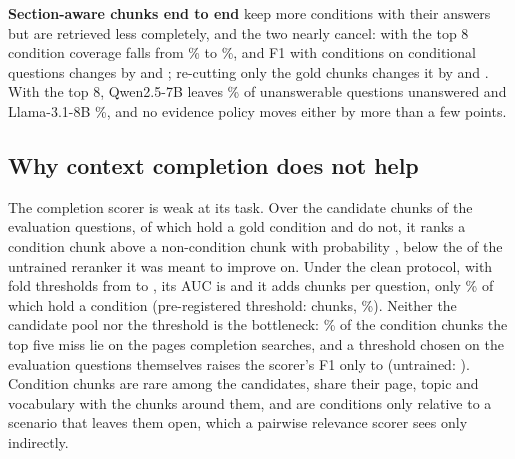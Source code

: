 \textbf{Section-aware chunks end to end} keep more conditions with their answers but are retrieved less completely, and the two nearly cancel: with the top 8 condition coverage falls from \revSecTopCondQwenCtxBase\% to \revSecTopCondQwenCtx\%, and F1 with conditions on conditional questions changes by \revSecTopCondQwenPt{} and \revSecTopCondLlamaPt; re-cutting only the gold chunks changes it by \revSecGoldCondQwenPt{} and \revSecGoldCondLlamaPt. With the top 8, Qwen2.5-7B leaves \unansTopQwen\% of unanswerable questions unanswered and Llama-3.1-8B \unansTopLlama\%, and no evidence policy moves either by more than a few points.

\subsection{Why context completion does not help}
\label{sec:completion}

The completion scorer is weak at its task. Over the candidate chunks of the evaluation questions, \qPosPairs{} of which hold a gold condition and \qNegPairs{} do not, it ranks a condition chunk above a non-condition chunk with probability \qAucTrained, below the \qAucZero{} of the untrained reranker it was meant to improve on. Under the clean protocol, with fold thresholds from \clThMin{} to \clThMax, its AUC is \clAuc{} and it adds \clAdded{} chunks per question, only \clPrec\% of which hold a condition (pre-registered threshold: \qAddedTrained{} chunks, \qPrecTrained\%). Neither the candidate pool nor the threshold is the bottleneck: \ceilMissedInPool\% of the condition chunks the top five miss lie on the pages completion searches, and a threshold chosen on the evaluation questions themselves raises the scorer's F1 only to \sweepBestTrained{} (untrained: \sweepBestZero). Condition chunks are rare among the candidates, share their page, topic and vocabulary with the chunks around them, and are conditions only relative to a scenario that leaves them open, which a pairwise relevance scorer sees only indirectly.

